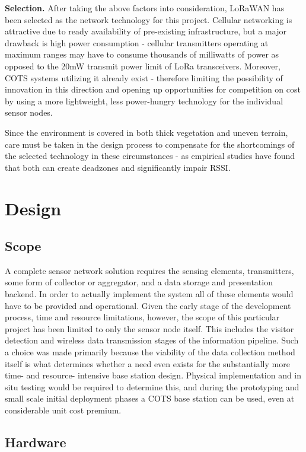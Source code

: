 \documentclass[10pt,nocopyrightspace]{ewsn-proc}
\begin{document}
\textbf{Selection.} After taking the above factors into consideration, LoRaWAN has been selected as the network technology for this project. Cellular networking is attractive due to ready availability of pre-existing infrastructure, but a major drawback is high power consumption - cellular transmitters operating at maximum ranges may have to consume thousands of milliwatts of power as opposed to the 20mW transmit power limit of LoRa transceivers. \cite{Lora-docs} Moreover, COTS systems utilizing it already exist - therefore limiting the possibility of innovation in this direction and opening up opportunities for competition on cost by using a more lightweight, less power-hungry technology for the individual sensor nodes. 

Since the environment is covered in both thick vegetation and uneven terrain, care must be taken in the design process to compensate for the shortcomings of the selected technology in these circumstances - as empirical studies have found\cite{LORAWAN-hills} that both can create deadzones and significantly impair RSSI.


\section{Design}

\subsection{Scope}
A complete sensor network solution requires the sensing elements, transmitters, some form of collector or aggregator, and a data storage and presentation backend. In order to actually implement the system all of these elements would have to be provided and operational. Given the early stage of the development process, time and resource limitations, however, the scope of this particular project has been limited to only the sensor node itself. This includes the visitor detection and wireless data transmission stages of the information pipeline. Such a choice was made primarily because the viability of the data collection method itself is what determines whether a need even exists for the substantially more time- and resource- intensive base station design. Physical implementation and in situ testing would be required to determine this, and during the prototyping and small scale initial deployment phases a COTS base station can be used, even at considerable unit cost premium.


\subsection{Hardware}
\end{document}
